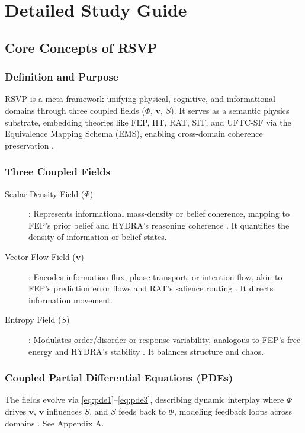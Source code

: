 \documentclass[12pt]{report}
\newcommand{\PhiRSVP}{\Phi}
\newcommand{\vRSVP}{\mathbf{v}}
\newcommand{\SRSVP}{S}
\begin{document}
\part{Detailed Study Guide}

\chapter{Core Concepts of RSVP}
\section{Definition and Purpose}
RSVP is a meta-framework unifying physical, cognitive, and informational domains through three coupled fields (\(\PhiRSVP\), \(\vRSVP\), \(\SRSVP\)). It serves as a semantic physics substrate, embedding theories like FEP, IIT, RAT, SIT, and UFTC-SF via the Equivalence Mapping Schema (EMS), enabling cross-domain coherence preservation \citep{RSVPMeta2025}.

\section{Three Coupled Fields}
\begin{description}
    \item[Scalar Density Field (\(\PhiRSVP\))]: Represents informational mass-density or belief coherence, mapping to FEP’s prior belief \citep{Friston2010} and HYDRA’s reasoning coherence \citep{HYDRA2025}. It quantifies the density of information or belief states.
    \item[Vector Flow Field (\(\vRSVP\))]: Encodes information flux, phase transport, or intention flow, akin to FEP’s prediction error flows and RAT’s salience routing \citep{RAT2025}. It directs information movement.
    \item[Entropy Field (\(\SRSVP\))]: Modulates order/disorder or response variability, analogous to FEP’s free energy and HYDRA’s stability \citep{Friston2010, HYDRA2025}. It balances structure and chaos.
\end{description}

\section{Coupled Partial Differential Equations (PDEs)}
The fields evolve via \eqref{eq:pde1}--\eqref{eq:pde3}, describing dynamic interplay where \(\PhiRSVP\) drives \(\vRSVP\), \(\vRSVP\) influences \(\SRSVP\), and \(\SRSVP\) feeds back to \(\PhiRSVP\), modeling feedback loops across domains \citep{RSVPMeta2025}. See Appendix A.
\end{document}

